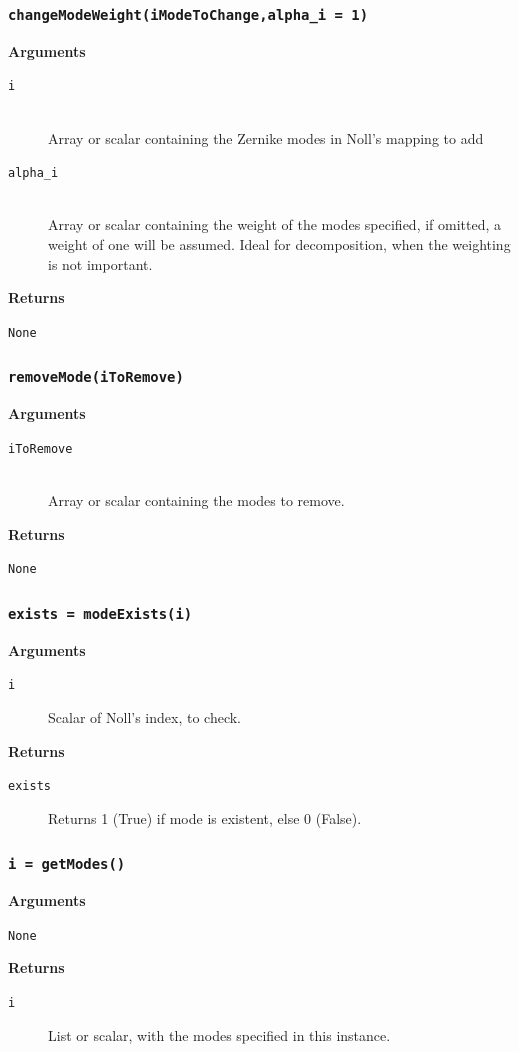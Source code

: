 \documentclass{article}
\begin{document}
\newpage
\subsubsection*{\texttt{changeModeWeight(iModeToChange,alpha\_i = 1)}}
\textbf{Arguments}
\begin{description}
  \item[\texttt{i}] \hfill \\
  Array or scalar containing the Zernike modes in Noll's mapping to add
  \item[\texttt{alpha\_i}] \hfill \\
  Array or scalar containing the weight of the modes specified, if omitted, a weight of one will be assumed. Ideal for decomposition, when the weighting is not important.
\end{description}
\textbf{Returns}
\begin{description}
	\item[\texttt{None}]
\end{description}

\newpage
\subsubsection*{\texttt{removeMode(iToRemove)}}
\textbf{Arguments}
\begin{description}
  \item[\texttt{iToRemove}] \hfill \\
  Array or scalar containing the modes to remove.
\end{description}
\textbf{Returns}
\begin{description}
	\item[\texttt{None}]
\end{description}

\newpage
\subsubsection*{\texttt{exists = modeExists(i)}}
\textbf{Arguments}
\begin{description}
	\item[\texttt{i}]
	Scalar of Noll's index, to check.
\end{description}
\textbf{Returns}
\begin{description}
	\item[\texttt{exists}]
	Returns 1 (True) if mode is existent, else 0 (False).
\end{description}

\newpage
\subsubsection*{\texttt{i = getModes()}}
\textbf{Arguments}
\begin{description}
	\item[\texttt{None}]
\end{description}
\textbf{Returns}
\begin{description}
	\item[\texttt{i}]
	List or scalar, with the modes specified in this instance.
\end{description}
\end{document}
